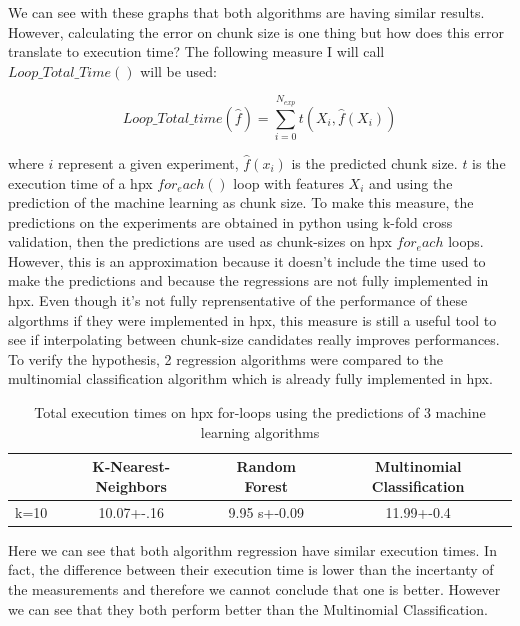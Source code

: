\documentclass[12pt]{article}
\begin{document}
We can see with these graphs that both algorithms are having similar results. However, calculating the error on chunk size is one thing but how does this error translate to execution time? The following measure I will call $Loop\_Total\_Time()$ will be used:

$$Loop\_Total\_time(\hat{f})=\sum_{i=0}^{N_{exp}} t(X_i,\hat{f}(X_i))$$

where $i$ represent a given experiment, $\hat{f}(x_i)$ is the predicted chunk size. $t$ is the execution time of a hpx $for_each()$ loop with features $X_i$ and using the prediction of the machine learning as chunk size. To make this measure, the predictions on the experiments are obtained in python using k-fold cross validation, then the predictions are used as chunk-sizes on hpx $for_each$ loops. However, this is an approximation because it doesn't include the time used to make the predictions and because the regressions are not fully implemented in hpx. Even though it's not fully reprensentative of the performance of these algorthms if they were implemented in hpx, this measure is still a useful tool to see if interpolating between chunk-size candidates really improves performances. To verify the hypothesis, 2 regression algorithms were compared to the multinomial classification algorithm which is already fully implemented in hpx. 

\begin{table}[h]
	\centering
	\caption{Total execution times on hpx for-loops using the predictions of 3 machine learning algorithms }
	\label{my-label}
	\begin{tabular}{|c|c|c|c|}
		\hline
		& K-Nearest-Neighbors & Random Forest &Multinomial Classification\\ \hline
		k=10 & 10.07+-.16  & 9.95 s+-0.09 & 11.99+-0.4\\ \hline
	\end{tabular}
\end{table}

Here we can see that both algorithm regression have similar execution times. In fact, the difference between their execution time is lower than the incertanty of the measurements and therefore we cannot conclude that one is better. However we can see that they both perform better than the Multinomial Classification.
\end{document}
